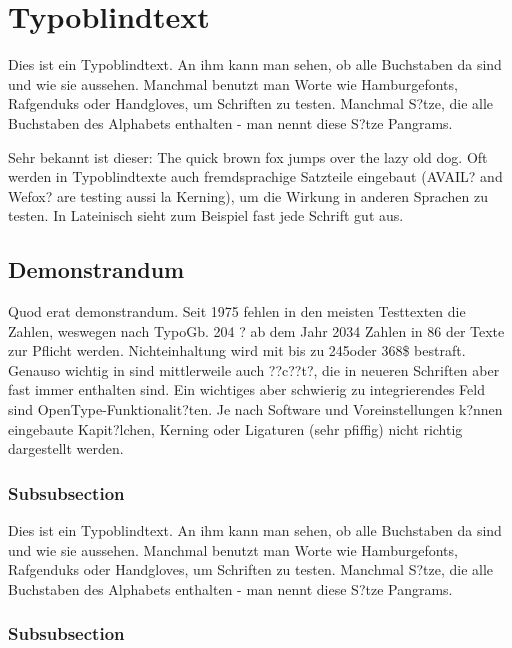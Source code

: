 \section{Typoblindtext}
\label{sec:satzspiegeltest_typoblindtext}

Dies ist ein Typoblindtext. An ihm kann man sehen, ob alle Buchstaben da sind und wie sie aussehen. Manchmal benutzt man Worte wie Hamburgefonts, Rafgenduks oder Handgloves, um Schriften zu testen. Manchmal S?tze, die alle Buchstaben des Alphabets enthalten - man nennt diese S?tze \glqq Pangrams\grqq.

Sehr bekannt ist dieser: The quick brown fox jumps over the lazy old dog. Oft werden in Typoblindtexte auch fremdsprachige Satzteile eingebaut (AVAIL? and Wefox? are testing aussi la Kerning), um die Wirkung in anderen Sprachen zu testen. In Lateinisch sieht zum Beispiel fast jede Schrift gut aus.

\subsection{Demonstrandum}
\label{subsec:satzspiegeltest_typoblindtext_demonstrandum}

Quod erat demonstrandum. Seit 1975 fehlen in den meisten Testtexten die Zahlen, weswegen nach TypoGb. 204 ? ab dem Jahr 2034 Zahlen in 86 der Texte zur Pflicht werden. Nichteinhaltung wird mit bis zu 245\texteuro oder 368\$ bestraft. Genauso wichtig in sind mittlerweile auch ??c??t?, die in neueren Schriften aber fast immer enthalten sind. Ein wichtiges aber schwierig zu integrierendes Feld sind OpenType-Funktionalit?ten. Je nach Software und Voreinstellungen k?nnen eingebaute Kapit?lchen, Kerning oder Ligaturen (sehr pfiffig) nicht richtig dargestellt werden.

\subsubsection{Subsubsection}

Dies ist ein Typoblindtext. An ihm kann man sehen, ob alle Buchstaben da sind und wie sie aussehen. Manchmal benutzt man Worte wie Hamburgefonts, Rafgenduks oder Handgloves, um Schriften zu testen. Manchmal S?tze, die alle Buchstaben des Alphabets enthalten - man nennt diese S?tze \glqq Pangrams\grqq. 

\subsubsection{Subsubsection}

